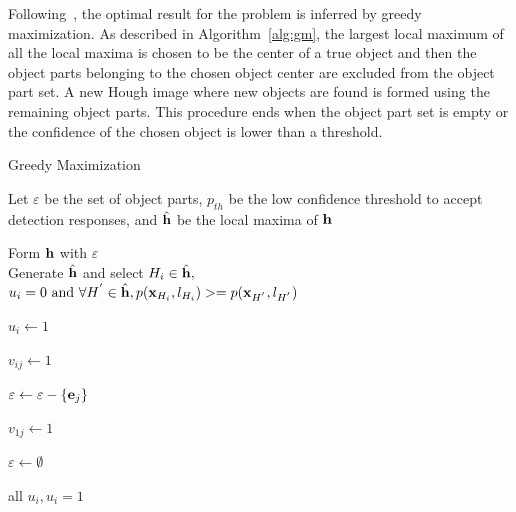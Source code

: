 \documentclass[10pt,twocolumn,letterpaper]{article}
\begin{document}
Following~\cite{ac9}, the optimal result for the problem is inferred by greedy maximization. As described in Algorithm~\ref{alg:gm}, the largest local maximum of all the local maxima is chosen to be the center of a true object and then the object parts belonging to the chosen object center are excluded from the object part set. A new Hough image where new objects are found is formed using the remaining object parts. This procedure ends when the object part set is empty or the confidence of the chosen object is lower than a threshold.
\begin{algorithm}[h]

    \caption{Greedy Maximization}
    \label{alg:gm}
     Let $\varepsilon$ be the set of object parts, $p_{th}$ be the low confidence threshold to accept detection responses, and $\hat{\bf{h}}$ be the local maxima of $\bf{h}$

    \begin{algorithmic}[1]




        \WHILE {$\varepsilon \ne \emptyset$}

            \STATE Form $\bf{h}$ with $\varepsilon$\\

            \STATE Generate $\hat{\bf{h}}$ and select $H_i \in {\hat{\bf{h}}},$\\ $u_i=0 \mbox{ and }\forall {H^{'}} \in {\hat{\bf{h}}, p({\bf{x}}_{H_i},l_{H_i}) >= p({\bf{x}}_{H^{'}},l_{H^{'}}) } $

                \STATE $u_i\leftarrow1$



                    \STATE $v_{ij}\leftarrow1$

                    \STATE $\varepsilon\leftarrow \varepsilon -\{ {\bf{e}}_j \}$

                    \ENDIF

                \ENDFOR

            \ELSE


                \STATE $v_{1j}\leftarrow1$

                \ENDFOR

                \STATE $\varepsilon\leftarrow \emptyset$

            \ENDIF

        \ENDWHILE
    \RETURN all $u_i,u_i=1$

    \end{algorithmic}

\end{algorithm}
\end{document}
